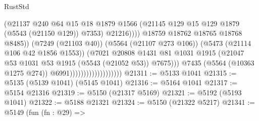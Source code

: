 \begin{lexlean}{RustStd}
\begin{coremodule}
                                                      (@21137
                                                        @240
                                                        @64
                                                        @15
                                                        @18
                                                        @1879
                                                        @1566
                                                        (@21145
                                                          @129
                                                          @15
                                                          @129
                                                          @1879
                                                          (@5543 (@21150 @129))
                                                          @7353)
                                                        @21216))))
                                                @18759
                                                @18762
                                                @18765
                                                @18768
                                                @8485))
                                            (@7249 (@21103 @40))
                                            (@5564 (@21107 @273 @106))
                                            (@5473 (@21114 @106 @42 @1856 @1553))
                                            (@7021
                                              @20808
                                              @1431
                                              @81
                                              @1031
                                              @1915
                                              (@21047
                                                @53
                                                @1031
                                                @53
                                                @1915
                                                (@5543 (@21052 @53))
                                                @7675)))
                                          @7435
                                          (@5564 (@10363 @1275 @274))
                                          @6991)))))))))))))))))))
@21311 := @5133 @1041
@21315 := @5135 (@5139 @1041) (@5145 @1041)
@21316 := @5164 @1041
@21317 := @5154 @21316
@21319 := @5150 (@21317 @5169)
@21321 := @5192 (@5193 @1041)
@21322 := @5188 @21321
@21324 := @5150 (@21322 @5217)
@21341 := @5149
    (fun (fn : @29) =>

\end{coremodule}
\end{lexlean}
